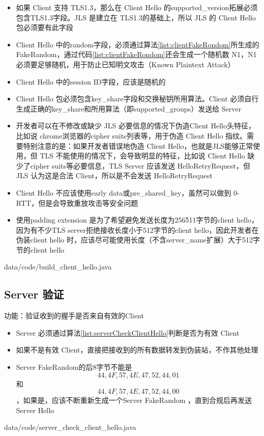 \begin{itemize}
	\item 如果 Client 支持 TLS1.3，那么在 Client Hello 的supported\_version拓展必须包含TLS1.3字段。JLS 是建立在 TLS1.3的基础上，所以 JLS 的 Client Hello 包必须要有此字段

	\item Client Hello 中的random字段，必须通过算法\ref{list:clientFakeRondom}所生成的FakeRandom，通过代码\ref{list:clientFakeRondom}还会生成一个随机数 N1，N1 必须要足够随机，用于防止已知明文攻击（Known Plaintext Attack）

	\item Client Hello 中的session ID字段，应该是随机的

	\item Client Hello 包必须包含key\_share字段和交换秘钥所用算法。Client 必须自行生成正确的key\_share和所用算法（即supported\_groups）发送给 Server

	\item 开发者可以在不修改或缺少 JLS 必要信息的情况下伪造Client Hello头特征，比如说 chrome浏览器的cipher suits列表等，用于伪造 Client Hello 指纹。需要特别注意的是：如果开发者错误地伪造 Client Hello，也就是JLS能够正常使用，但 TLS 不能使用的情况下，会导致明显的特征，比如说 Client Hello 缺少了cipher suits等必要信息，TLS Server 应该发送 HelloRetryRequest，但JLS 认为这是合法 Client，所以是不会发送 HelloRetryRequest

	\item Client Hello 不应该使用early data或pre\_shared\_key，虽然可以做到 0-RTT，但是会导致重放攻击等安全问题

	\item 使用padding extension 是为了希望避免发送长度为256\~511字节的client hello，因为有不少TLS server拒绝接收长度小于512字节的client hello，因此开发者在伪装client hello 时，应该尽可能使用长度（不含server\_name扩展）大于512字节的client hello
\end{itemize}

 {data/code/build_client_hello.java}


\subsection{Server 验证}
功能：验证收到的握手是否来自有效的Client
\begin{itemize}
	\item Server 必须通过算法\ref{list:serverCheckClientHello}判断是否为有效 Client

	\item 如果不是有效 Client，直接把接收到的所有数据转发到伪装站，不作其他处理

	\item Server FakeRandom的后8字节不能是\[ 44,4F,57,4E,47,52,44,01 \]和\[ 44,4F,57,4E,47,52,44,00 \]，如果是，应该不断重新生成一个Server FakeRandom ，直到合规后再发送 Server Hello

\end{itemize}
 {data/code/server_check_client_hello.java}

